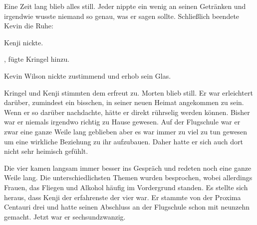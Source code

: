 \par

Eine Zeit lang blieb alles still. Jeder nippte ein wenig an seinen Getränken und irgendwie wusste niemand so genau, was er sagen sollte. Schließlich beendete Kevin die Ruhe: 

\par

Kenji nickte. 

\par

, fügte Kringel hinzu. 

\par

Kevin Wilson nickte zustimmend und erhob sein Glas. 

\par

Kringel und Kenji stimmten dem erfreut zu. Morten blieb still. Er war erleichtert darüber, zumindest ein bisschen, in seiner neuen Heimat angekommen zu sein. Wenn er so darüber nachdachte, hätte er direkt rührselig werden können. Bisher war er niemals irgendwo richtig zu Hause gewesen. Auf der Flugschule war er zwar eine ganze Weile lang geblieben aber es war immer zu viel zu tun gewesen um eine wirkliche Beziehung zu ihr aufzubauen. Daher hatte er sich auch dort nicht sehr heimisch gefühlt.

\par

Die vier kamen langsam immer besser ins Gespräch und redeten noch eine ganze Weile lang. Die unterschiedlichsten Themen wurden besprochen, wobei allerdings Frauen, das Fliegen und Alkohol häufig im Vordergrund standen. Es stellte sich heraus, dass Kenji der erfahrenste der vier war. Er stammte von der Proxima Centauri drei und hatte seinen Abschluss an der Flugschule schon mit neunzehn gemacht. Jetzt war er sechsundzwanzig.

